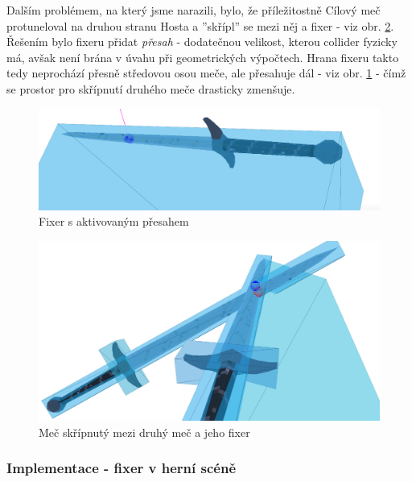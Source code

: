 \bigbreak

Dalším problémem, na který jsme narazili, bylo, že příležitostně Cílový meč protuneloval na druhou stranu Hosta a ''skřípl'' se mezi něj a fixer - viz obr. \ref{obr05:fixerSqueak}. Řešením bylo fixeru přidat \textit{přesah} - dodatečnou velikost, kterou collider fyzicky má, avšak není brána v úvahu při geometrických výpočtech. Hrana fixeru takto tedy neprochází přesně středovou osou meče, ale přesahuje dál - viz obr. \ref{obr05:fixerOverreach} - čímž se prostor pro skřípnutí druhého meče drasticky zmenšuje. 

\begin{figure}[ht]\centering
  \center
  \includegraphics[width=140mm]{../img/fixerOverreach.png}
  \caption{Fixer s aktivovaným přesahem}
  \label{obr05:fixerOverreach}
\end{figure} 

\begin{figure}[ht]\centering
  \center
  \includegraphics[width=140mm]{../img/fixerSqueak.png}
  \caption{Meč skřípnutý mezi druhý meč a jeho fixer}
  \label{obr05:fixerSqueak}
\end{figure} 



\subsubsection*{Implementace - fixer v herní scéně}

